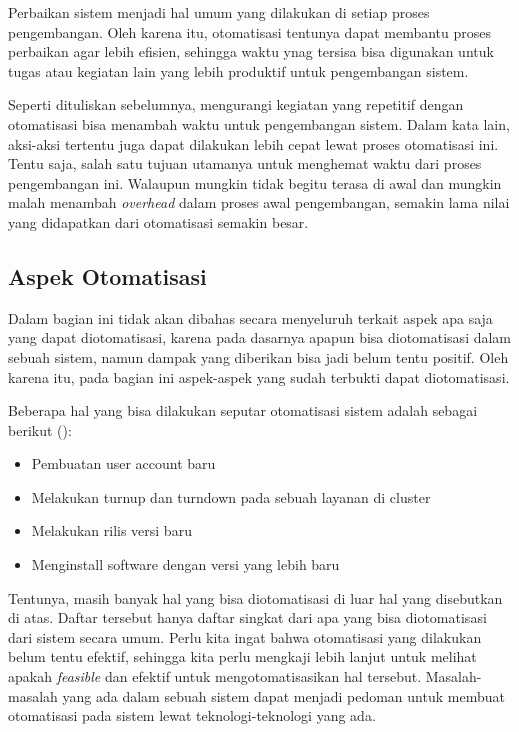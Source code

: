 Perbaikan sistem menjadi hal umum yang dilakukan di setiap proses pengembangan.
Oleh karena itu, otomatisasi tentunya dapat membantu proses perbaikan agar lebih efisien, sehingga waktu ynag tersisa bisa digunakan untuk tugas atau kegiatan lain yang lebih produktif untuk pengembangan sistem.

Seperti dituliskan sebelumnya, mengurangi kegiatan yang repetitif dengan otomatisasi bisa menambah waktu untuk pengembangan sistem.
Dalam kata lain, aksi-aksi tertentu juga dapat dilakukan lebih cepat lewat proses otomatisasi ini.
Tentu saja, salah satu tujuan utamanya untuk menghemat waktu dari proses pengembangan ini.
Walaupun mungkin tidak begitu terasa di awal dan mungkin malah menambah \textit{overhead} dalam proses awal pengembangan, semakin lama nilai yang didapatkan dari otomatisasi semakin besar.

\subsection{Aspek Otomatisasi}
Dalam bagian ini tidak akan dibahas secara menyeluruh terkait aspek apa saja yang dapat diotomatisasi, karena pada dasarnya apapun bisa diotomatisasi dalam sebuah sistem, namun dampak yang diberikan bisa jadi belum tentu positif.
Oleh karena itu, pada bagian ini aspek-aspek yang sudah terbukti dapat diotomatisasi.

Beberapa hal yang bisa dilakukan seputar otomatisasi sistem adalah sebagai berikut (\cite{beyer2016site}):
\begin{itemize}
  \item Pembuatan user account baru
  \item Melakukan turnup dan turndown pada sebuah layanan di cluster
  \item Melakukan rilis versi baru
  \item Menginstall software dengan versi yang lebih baru
\end{itemize}

Tentunya, masih banyak hal yang bisa diotomatisasi di luar hal yang disebutkan di atas.
Daftar tersebut hanya daftar singkat dari apa yang bisa diotomatisasi dari sistem secara umum. 
Perlu kita ingat bahwa otomatisasi yang dilakukan belum tentu efektif, sehingga kita perlu mengkaji lebih lanjut untuk melihat apakah \textit{feasible} dan efektif untuk mengotomatisasikan hal tersebut.
Masalah-masalah yang ada dalam sebuah sistem dapat menjadi pedoman untuk membuat otomatisasi pada sistem lewat teknologi-teknologi yang ada.

